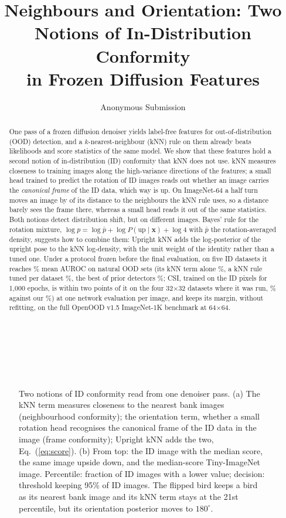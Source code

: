 \documentclass{article}
\title{Neighbours and Orientation: Two Notions of In-Distribution Conformity\\in Frozen Diffusion Features}
\author{Anonymous Submission}
\newcommand{\up}{\mathrm{up}}
\begin{document}
\maketitle
\begin{figure}[t]\centering
{}\\[0.3mm]
\resizebox{0.93\textwidth}{!}{}\\[1.5mm]
\\[0.6mm]
\resizebox{0.68\textwidth}{!}{}
\caption{Two notions of ID conformity read from one denoiser pass. (a) The kNN term measures closeness to the nearest bank images (neighbourhood conformity); the orientation term, whether a small rotation head recognises the canonical frame of the ID data in the image (frame conformity); Upright kNN adds the two, Eq.~(\ref{eq:score}). (b) From top: the ID image with the median score, the same image upside down, and the median-score Tiny-ImageNet image. Percentile: fraction of ID images with a lower value; decision: threshold keeping 95\% of ID images. The flipped bird keeps a bird as its nearest bank image and its kNN term stays at the 21st percentile, but its orientation posterior moves to $180^\circ$.}
\label{fig:method}
\end{figure}

\begin{abstract}
One pass of a frozen diffusion denoiser yields label-free features for out-of-distribution (OOD) detection, and a $k$-nearest-neighbour (kNN) rule on them already beats likelihoods and score statistics of the same model. We show that these features hold a second notion of in-distribution (ID) conformity that kNN does not use. kNN measures closeness to training images along the high-variance directions of the features; a small head trained to predict the rotation of ID images reads out whether an image carries the \emph{canonical frame} of the ID data, which way is up. On ImageNet-64 a half turn moves an image by \ratioIN{} of its distance to the neighbours the kNN rule uses, so a distance barely sees the frame there, whereas a small head reads it out of the same statistics. Both notions detect distribution shift, but on different images. Bayes' rule for the rotation mixture, $\log p=\log\bar p+\log P(\up\mid\mathbf{x})+\log 4$ with $\bar p$ the rotation-averaged density, suggests how to combine them: Upright kNN adds the log-posterior of the upright pose to the kNN log-density, with the unit weight of the identity rather than a tuned one. Under a protocol frozen before the final evaluation, on five ID datasets it reaches \oursMean\% mean AUROC on natural OOD sets (its kNN term alone \contentMean\%, a kNN rule tuned per dataset \tunedMean\%, the best of \nPrior{} prior detectors \bestPriorMean\%; CSI, trained on the ID pixels for 1{,}000 epochs, is within two points of it on the four 32$\times$32 datasets where it was run, \csiMean\% against our \csiOursMean\%) at one network evaluation per image, and keeps its margin, without refitting, on the full OpenOOD v1.5 ImageNet-1K benchmark at 64$\times$64.
\end{abstract}
\end{document}
